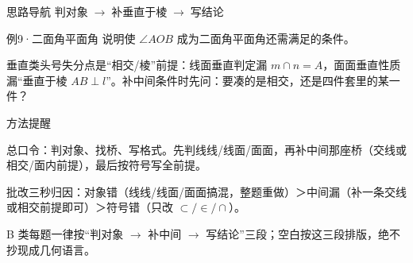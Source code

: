\documentclass{exam-zh}
\begin{document}
\begin{eduAuxItem}{思路导航}
判对象$\;\to\;$补垂直于棱$\;\to\;$写结论\end{eduAuxItem}




\begin{eduSubQuestionItem}{例9·二面角平面角}
说明使 $\angle AOB$ 成为二面角平面角还需满足的条件。\end{eduSubQuestionItem}

\begin{eduDualExplain}
  \begin{eduExplainLeft}
  \end{eduExplainLeft}

  \begin{eduExplainRight}
  \end{eduExplainRight}
\end{eduDualExplain}




\begin{eduMistakeBox}
垂直类头号失分点是“相交/棱”前提：线面垂直判定漏 $m\cap n=A$，面面垂直性质漏“垂直于棱 $AB\perp l$”。补中间条件时先问：要凑的是相交，还是四件套里的某一件？\end{eduMistakeBox}



\clearpage
{}

\begin{eduSummaryBlock}{\eduIconPin}{方法提醒}
\begin{eduBulletList}
  \item 总口令：判对象、找桥、写格式。先判线线/线面/面面，再补中间那座桥（交线或相交/面内前提），最后按符号写全前提。  \item 批改三秒归因：对象错（线线/线面/面面搞混，整题重做）＞中间漏（补一条交线或相交前提即可）＞符号错（只改 $\subset/\in/\cap$）。  \item B 类每题一律按“判对象 $\to$ 补中间 $\to$ 写结论”三段；空白按这三段排版，绝不抄现成几何语言。\end{eduBulletList}
\end{eduSummaryBlock}
\end{document}
